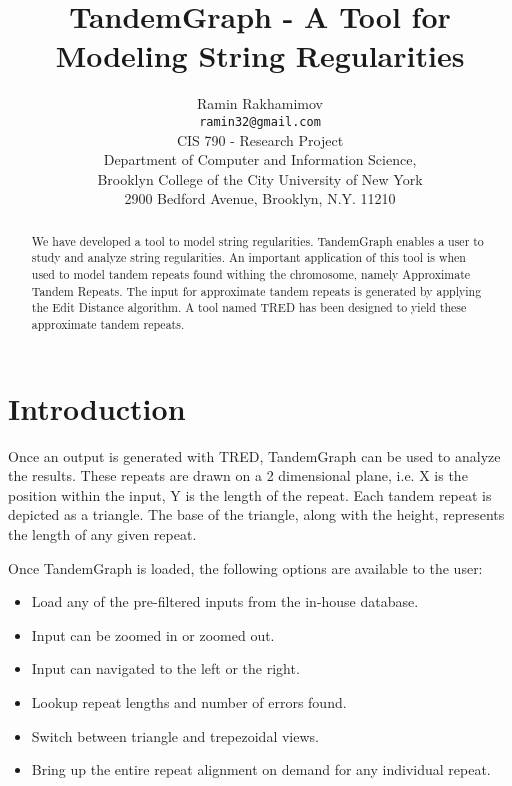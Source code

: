\documentclass[a4paper, 12pt]{article}
\begin{document}
\title{\Large TandemGraph - A Tool for Modeling String Regularities \cite{biocomp}}
\author{Ramin Rakhamimov \\
        \texttt{ramin32@gmail.com} \\
        CIS 790 - Research Project\\[1cm]
        Department of Computer and Information Science, \\
        Brooklyn College of the City University of New York \\
        2900 Bedford Avenue, Brooklyn, N.Y. 11210}
\maketitle

\begin{abstract}
We have developed a tool to model string regularities. TandemGraph enables a user to study and analyze string regularities. An important application of this tool is when used to model tandem repeats \cite{tandem1,tandem2} found withing the chromosome, namely Approximate Tandem Repeats. The input for approximate tandem repeats is generated by applying the Edit Distance algorithm. A tool named TRED \cite{tred1,tred2} has been designed to yield these approximate tandem repeats.
\end{abstract}

\section{Introduction}
Once an output is generated with TRED, TandemGraph can be used to analyze the results. These repeats are drawn on a 2 dimensional plane, i.e. X is the position within the input, Y is the length of the repeat. Each tandem repeat is depicted as a triangle. The base of the triangle, along with the height, represents the length of any given repeat.  

Once TandemGraph is loaded, the following options are available to the user:
\begin{itemize}
\item Load any of the pre-filtered inputs from the in-house database.
\item Input can be zoomed in or zoomed out.
\item Input can navigated to the left or the right.
\item Lookup repeat lengths and number of errors found.
\item Switch between triangle and trepezoidal views.
\item Bring up the entire repeat alignment on demand for any individual repeat.
\end{itemize}
\end{document}
